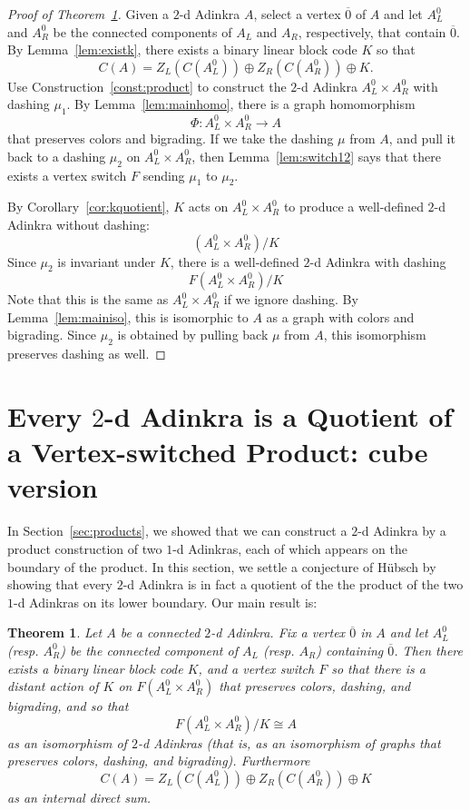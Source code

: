 \documentclass[12pt,twoside,singlespace]{article}
\numberwithin{equation}{section}
\newtheorem{thm}[equation]{Theorem}
\theoremstyle{definition}
\begin{document}
\begin{proof}[Proof of Theorem~\ref{thm:quotient}]
Given a $2$-d Adinkra $A$, select a vertex $\overline{0}$ of $A$ and let $A_L^0$ and $A_R^0$ be the connected components of $A_L$ and $A_R$, respectively, that contain $\overline{0}$.  By Lemma~\ref{lem:existk}, there exists a binary linear block code $K$ so that
\[C(A)=Z_L(C(A_L^0))\oplus Z_R(C(A_R^0))\oplus K.
\]
Use Construction~\ref{const:product} to construct the $2$-d Adinkra $A_L^0\times A_R^0$ with dashing $\mu_1$.
By Lemma~\ref{lem:mainhomo}, there is a graph homomorphism
\[\Phi:A_L^0\times A_R^0 \to A\]
that preserves colors and bigrading.  If we take the dashing $\mu$ from $A$, and pull it back to a dashing $\mu_2$ on $A_L^0\times A_R^0$, then Lemma~\ref{lem:switch12} says that there exists a vertex switch $F$ sending $\mu_1$ to $\mu_2$.

By Corollary~\ref{cor:kquotient}, $K$ acts on $A_L^0\times A_R^0$ to produce a well-defined $2$-d Adinkra without dashing:
\[(A_L^0\times A_R^0)/K\]
Since $\mu_2$ is invariant under $K$, there is a well-defined $2$-d Adinkra with dashing
\[F(A_L^0\times A_R^0)/K\]
Note that this is the same as $A_L^0\times A_R^0$ if we ignore dashing.  By Lemma~\ref{lem:mainiso}, this is isomorphic to $A$ as a graph with colors and bigrading.  Since $\mu_2$ is obtained by pulling back $\mu$ from $A$, this isomorphism preserves dashing as well.
\end{proof}



\section{Every $2$-d Adinkra is a Quotient of a Vertex-switched Product: cube version}
\label{sec:quotient2}

\color{purple}

In Section~\ref{sec:products}, we showed that we can construct a $2$-d Adinkra by a product construction of two $1$-d Adinkras, each of which appears on the boundary of the product. In this section, we settle a conjecture of H\"ubsch \cite{hubsch:weaving} by showing that every $2$-d Adinkra is in fact a quotient of the the product of the two $1$-d Adinkras on its lower boundary. Our main result is:

\begin{thm}
\label{thm:quotient}
Let $A$ be a connected $2$-d Adinkra.  Fix a vertex $\overline{0}$ in $A$ and let $A_L^0$ (resp. $A_R^0$) be the connected component of $A_L$ (resp. $A_R$) containing $\overline{0}$. Then there exists a binary linear block code $K$, and a vertex switch $F$ so that there is a distant action of $K$ on $F(A_L^0\times A_R^0)$ that preserves colors, dashing, and bigrading, and so that
\[F(A_L^0\times A_R^0)/K\cong A\]
as an isomorphism of $2$-d Adinkras (that is, as an isomorphism of graphs that preserves colors, dashing, and bigrading).  Furthermore
\begin{equation}
\label{eqn:kcomplement}
C(A)=Z_L(C(A_L^0))\oplus Z_R(C(A_R^0))\oplus K
\end{equation}
as an internal direct sum.
\end{thm}
\end{document}
